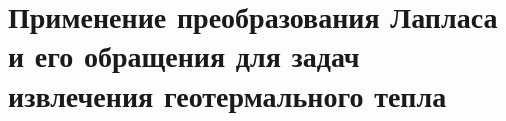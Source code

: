 \chapter{Применение преобразования Лапласа и его обращения для задач извлечения геотермального тепла}





